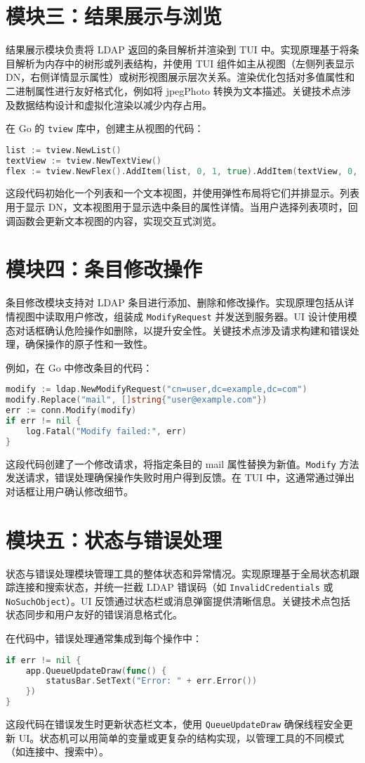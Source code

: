 \section{模块三：结果展示与浏览}
结果展示模块负责将 LDAP 返回的条目解析并渲染到 TUI 中。实现原理基于将条目解析为内存中的树形或列表结构，并使用 TUI 组件如主从视图（左侧列表显示 DN，右侧详情显示属性）或树形视图展示层次关系。渲染优化包括对多值属性和二进制属性进行友好格式化，例如将 jpegPhoto 转换为文本描述。关键技术点涉及数据结构设计和虚拟化渲染以减少内存占用。\par
在 Go 的 \texttt{tview} 库中，创建主从视图的代码：\par
\begin{lstlisting}[language=go]
list := tview.NewList()
textView := tview.NewTextView()
flex := tview.NewFlex().AddItem(list, 0, 1, true).AddItem(textView, 0, 2, false)
\end{lstlisting}
这段代码初始化一个列表和一个文本视图，并使用弹性布局将它们并排显示。列表用于显示 DN，文本视图用于显示选中条目的属性详情。当用户选择列表项时，回调函数会更新文本视图的内容，实现交互式浏览。\par
\section{模块四：条目修改操作}
条目修改模块支持对 LDAP 条目进行添加、删除和修改操作。实现原理包括从详情视图中读取用户修改，组装成 \texttt{ModifyRequest} 并发送到服务器。UI 设计使用模态对话框确认危险操作如删除，以提升安全性。关键技术点涉及请求构建和错误处理，确保操作的原子性和一致性。\par
例如，在 Go 中修改条目的代码：\par
\begin{lstlisting}[language=go]
modify := ldap.NewModifyRequest("cn=user,dc=example,dc=com")
modify.Replace("mail", []string{"user@example.com"})
err := conn.Modify(modify)
if err != nil {
    log.Fatal("Modify failed:", err)
}
\end{lstlisting}
这段代码创建了一个修改请求，将指定条目的 mail 属性替换为新值。\texttt{Modify} 方法发送请求，错误处理确保操作失败时用户得到反馈。在 TUI 中，这通常通过弹出对话框让用户确认修改细节。\par
\section{模块五：状态与错误处理}
状态与错误处理模块管理工具的整体状态和异常情况。实现原理基于全局状态机跟踪连接和搜索状态，并统一拦截 LDAP 错误码（如 \texttt{InvalidCredentials} 或 \texttt{NoSuchObject}）。UI 反馈通过状态栏或消息弹窗提供清晰信息。关键技术点包括状态同步和用户友好的错误消息格式化。\par
在代码中，错误处理通常集成到每个操作中：\par
\begin{lstlisting}[language=go]
if err != nil {
    app.QueueUpdateDraw(func() {
        statusBar.SetText("Error: " + err.Error())
    })
}
\end{lstlisting}
这段代码在错误发生时更新状态栏文本，使用 \texttt{QueueUpdateDraw} 确保线程安全更新 UI。状态机可以用简单的变量或更复杂的结构实现，以管理工具的不同模式（如连接中、搜索中）。\par
